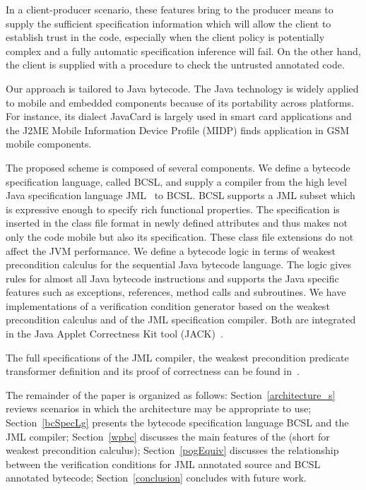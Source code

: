 In a client-producer scenario, these features bring to the producer means to supply the sufficient specification information 
which will allow the client to establish trust in the code, especially when the client policy is potentially complex and a fully automatic specification inference
will fail. On the other hand, the client is supplied with a procedure to check the untrusted annotated code. 

  

Our approach is tailored to Java bytecode.
The Java technology is widely applied to mobile and embedded components because of its portability across platforms. 
For instance, its dialect JavaCard is largely used in smart card applications and the J2ME Mobile Information Device Profile 
(MIDP) finds application in GSM mobile components. 

The proposed scheme is composed of several components.
 We define a bytecode specification language, called BCSL, and supply a compiler from 
 the high level Java specification language JML~\cite{JMLRefMan} to BCSL. 
 BCSL supports a JML subset which is expressive enough to specify rich functional properties. 
The specification is inserted in the class file format in newly defined attributes and thus makes not
 only the code mobile but also its specification. These class
 file extensions do not affect the JVM performance.
We define a bytecode logic in terms of weakest precondition calculus for the sequential Java bytecode language. 
The logic gives rules for almost all Java bytecode instructions and supports the Java specific features such as
exceptions, references, method calls and subroutines.  
 We have implementations of a verification condition generator based on the weakest precondition calculus and of
 the JML specification compiler. Both are integrated in the Java Applet Correctness Kit tool (JACK)~\cite{BRL-JACK}.

  The full specifications of the JML compiler, the weakest precondition predicate transformer definition and its proof of correctness can be found in~\cite{JBL05MP}.
  
The remainder of the paper is organized as follows: 
Section~\ref{architecture_s} reviews scenarios in which the architecture may be appropriate to use; 
 Section~\ref{bcSpecLg} presents the bytecode specification language BCSL and the JML compiler; Section~\ref{wpbc} discusses the main
features of the \wpi (short for weakest precondition calculus); Section~\ref{pogEquiv} discusses the relationship between the verification conditions for JML annotated source and BCSL annotated bytecode; Section~\ref{conclusion} concludes with future work.  















